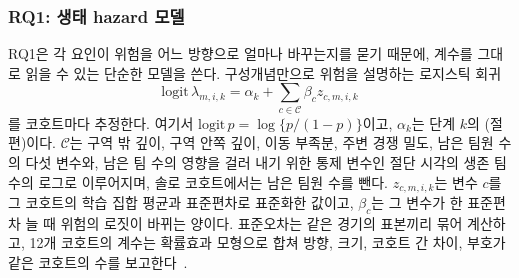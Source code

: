 \subsubsection{RQ1: 생태 hazard 모델}
\label{sec:method:rq1}
RQ1은 각 요인이 위험을 어느 방향으로 얼마나 바꾸는지를 묻기 때문에, 계수를 그대로 읽을 수 있는 단순한 모델을 쓴다.
구성개념만으로 위험을 설명하는 로지스틱 회귀
\begin{equation}
\mathrm{logit}\,\lambda_{m,i,k}=\alpha_k+\textstyle\sum_{c\in\mathcal{C}}\beta_c z_{c,m,i,k}
\label{eq:ehm}
\end{equation}
를 코호트마다 추정한다.
여기서 $\mathrm{logit}\,p=\log\{p/(1-p)\}$이고, $\alpha_k$는 단계 $k$의 (절편)이다.
$\mathcal{C}$는 구역 밖 깊이, 구역 안쪽 깊이, 이동 부족분, 주변 경쟁 밀도, 남은 팀원 수의 다섯 변수와, 남은 팀 수의 영향을 걸러 내기 위한 통제 변수인 절단 시각의 생존 팀 수의 로그로 이루어지며, 솔로 코호트에서는 남은 팀원 수를 뺀다.
$z_{c,m,i,k}$는 변수 $c$를 그 코호트의 학습 집합 평균과 표준편차로 표준화한 값이고, $\beta_c$는 그 변수가 한 표준편차 늘 때 위험의 로짓이 바뀌는 양이다.
표준오차는 같은 경기의 표본끼리 묶어 계산하고, 12개 코호트의 계수는 확률효과 모형으로 합쳐 방향, 크기, 코호트 간 차이, 부호가 같은 코호트의 수를 보고한다~\cite{DerSimonian86}.

